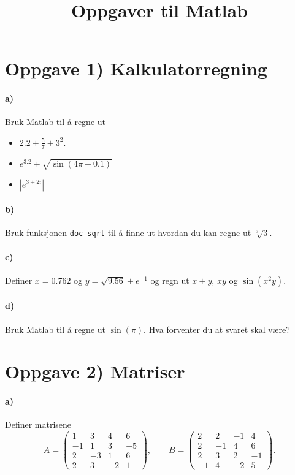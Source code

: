 \documentclass[a4paper, 11pt, notitlepage, english]{article}
\author{}
\date{}
\title{Oppgaver til Matlab}
\begin{document}
\maketitle

\section*{Oppgave 1) Kalkulatorregning}
\paragraph{a)}
Bruk Matlab til å regne ut 
\begin{itemize}
	\item $2.2 + \frac{5}{7} + 3^2$.
	\item $e^{3.2} + \sqrt{\sin(4\pi+0.1)}$
	\item $|e^{3+2i}|$
\end{itemize}

\paragraph{b)}
Bruk funksjonen \verb+doc sqrt+ til å finne ut hvordan du kan regne ut
$\sqrt[3]{3}.$

\paragraph{c)}
Definer $x=0.762$ og $y=\sqrt{9.56}+e^{-1}$ og regn ut $x+y$, $xy$ og $\sin (x^2y)$.

\paragraph{d)}
Bruk Matlab til å regne ut $\sin(\pi)$. Hva forventer du at svaret skal være? 


\section*{Oppgave 2) Matriser}
\paragraph{a)}
Definer matrisene
$$ A = \begin{pmatrix}
	1 & 3 & 4 & 6 \\ 
	-1 & 1 & 3 & -5  \\
	2 & -3 & 1 & 6 \\
	2 & 3 & -2 & 1
\end{pmatrix}, \qquad 
B = \begin{pmatrix}
	2 & 2 & -1 & 4 \\ 
	2 & -1 & 4 & 6  \\
	2 & 3 & 2 & -1 \\
	-1 & 4 & -2 & 5
\end{pmatrix}. $$
\end{document}
